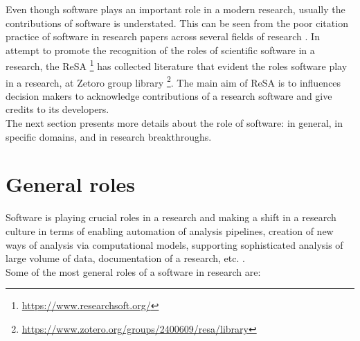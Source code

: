 Even though software plays an important role in a modern research, usually the contributions of software is understated. This can be seen from the poor citation practice of software in research papers across several fields of research \citep{schindler2021somesci,yang2018important, pan2016disciplinary}.  In attempt to promote the recognition of the roles of scientific software in a research, the \ac{ReSA} \footnote{\url{https://www.researchsoft.org/}} has collected literature that evident the roles software play in a research, at Zetoro group library \footnote{\url{https://www.zotero.org/groups/2400609/resa/library}}. The main aim of \ac{ReSA} is to influences decision makers to acknowledge contributions of a research software and give credits to its developers.\\

The next section presents more details about the role of software: in general, in specific domains, and in research breakthroughs.


\section{General roles}
\label{sec:Roles:Generalroles}

Software is playing crucial roles in a research and making a shift in a research culture in terms of  enabling automation of analysis pipelines, creation of new ways of analysis via computational models, supporting sophisticated analysis of large volume of data, documentation of a research, etc. \citep{jay2020software}. \\

\noindent Some of the most general roles of a software in research are:


